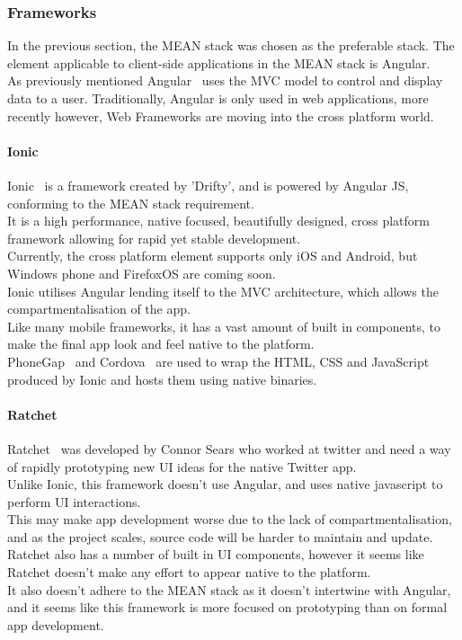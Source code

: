 \documentclass[preprint,12pt,3p]{elsarticle}
\begin{document}
\subsubsection{Frameworks}
In the previous section, the MEAN stack was chosen as the preferable stack. The element applicable to client-side applications in the MEAN stack is Angular.\\
As previously mentioned Angular~\cite{angular} uses the MVC model to control and display data to a user. Traditionally, Angular is only used in web applications, more recently however, Web Frameworks are moving into the cross platform world.

\paragraph{Ionic}
Ionic~\cite{ionic} is a framework created by 'Drifty', and is powered by Angular JS, conforming to the MEAN stack requirement.\\
It is a high performance, native focused, beautifully designed, cross platform framework allowing for rapid yet stable development.\\
Currently, the cross platform element supports only iOS and Android, but Windows phone and FirefoxOS are coming soon.\\
Ionic utilises Angular lending itself to the MVC architecture, which allows the compartmentalisation of the app.\\
Like many mobile frameworks, it has a vast amount of built in components, to make the final app look and feel native to the platform.\\ PhoneGap~\cite{phonegap} and Cordova~\cite{Cordova} are used to wrap the HTML, CSS and JavaScript produced by Ionic and hosts them using native binaries.

\paragraph{Ratchet}
Ratchet~\cite{ratchet} was developed by Connor Sears who worked at twitter and need a way of rapidly prototyping new UI ideas for the native Twitter app.\\
Unlike Ionic, this framework doesn't use Angular, and uses native javascript to perform UI interactions.\\
This may make app development worse due to the lack of compartmentalisation, and as the project scales, source code will be harder to maintain and update.\\
Ratchet also has a number of built in UI components, however it seems like Ratchet doesn't make any effort to appear native to the platform.\\
It also doesn't adhere to the MEAN stack as it doesn't intertwine with Angular, and it seems like this framework is more focused on prototyping than on formal app development.
\end{document}
